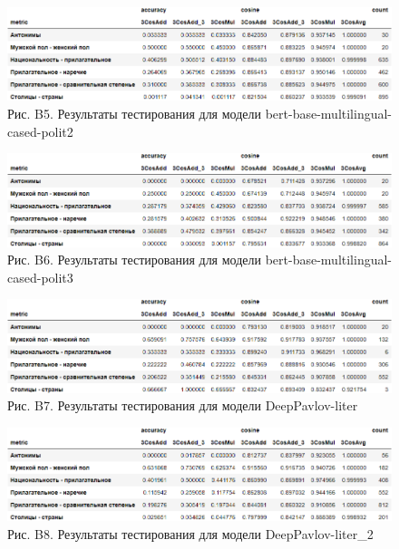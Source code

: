 \documentclass[a4paper,14pt]{article}
\begin{document}
\begin{figure}[H]
	\centering
	\includegraphics[width=0.9\linewidth]{image/res_bert-base-multilingual-cased-polit2 }
	\caption*{Рис. B5. Результаты тестирования для модели bert-base-multilingual-cased-polit2 }
	\label{fig:resbert-base-multilingual-cased-polit2 }
\end{figure}

\begin{figure}[H]
	\centering
	\includegraphics[width=0.9\linewidth]{image/res_bert-base-multilingual-cased-polit3 }
	\caption*{Рис. B6. Результаты тестирования для модели bert-base-multilingual-cased-polit3 }
	\label{fig:resbert-base-multilingual-cased-polit3 }
\end{figure}

\begin{figure}[H]
	\centering
	\includegraphics[width=0.9\linewidth]{image/res_DeepPavlov-liter }
	\caption*{Рис. B7. Результаты тестирования для модели DeepPavlov-liter }
	\label{fig:resDeepPavlov-liter }
\end{figure}

\begin{figure}[H]
	\centering
	\includegraphics[width=0.9\linewidth]{image/res_DeepPavlov-liter_2 }
	\caption*{Рис. B8. Результаты тестирования для модели DeepPavlov-liter\_2 }
	\label{fig:resDeepPavlov-liter2 }
\end{figure}
\end{document}
